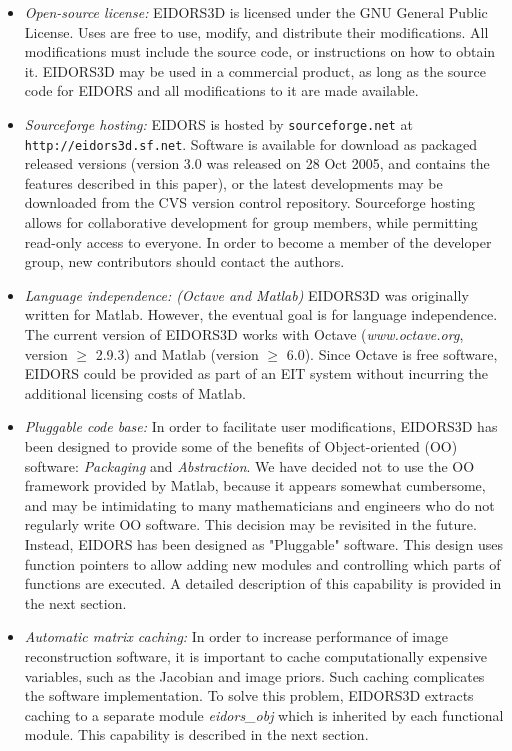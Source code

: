 \documentclass[12pt]{iopart}
\begin{document}
\begin{itemize}

  \item {\em Open-source license:}
EIDORS3D is licensed under the
GNU General Public License. Uses are free to use, modify, and
distribute their modifications. All modifications must include the
source code, or instructions on how to obtain it. EIDORS3D may be used
in a commercial product, as long as the source code for EIDORS and all
modifications to it are made available.

  \item {\em Sourceforge hosting:}
EIDORS is hosted by {\tt sourceforge.net}
at {\tt http://eidors3d.sf.net}.
Software is available for download as packaged released versions
(version 3.0 was released on 28 Oct 2005, and
contains the features described in this paper),
or the latest developments may be downloaded from the CVS
version control repository.
Sourceforge hosting allows for collaborative development for
group members, while permitting read-only access to everyone.
In order to become a member of the developer group, new
contributors should contact the authors.

  \item {\em Language independence: (Octave and Matlab)}
EIDORS3D was originally written for Matlab.
However, the eventual goal is for language independence.
The current version of EIDORS3D works with Octave
({\em www.octave.org}, version $\ge$ 2.9.3)
and Matlab (version $\ge$ 6.0).
Since Octave is free software, EIDORS could be provided
as part of an EIT system without incurring the additional
licensing costs of Matlab.

  \item {\em Pluggable code base:}
In order to facilitate user modifications, EIDORS3D
has been designed to provide some of the benefits of
Object-oriented (OO) software: {\em Packaging}
 and {\em Abstraction}. We have decided not to
use the OO framework provided by Matlab, because
it appears somewhat cumbersome, and may be intimidating
to many mathematicians and engineers who do not 
regularly write OO software. This decision may
be revisited in the future.
Instead, EIDORS has been designed as 
"Pluggable" software. This design uses function
pointers to allow adding new modules and controlling
which parts of functions are executed.
A detailed description of this capability is
provided in the next section.

  \item {\em Automatic matrix caching:}
In order to increase
performance of image reconstruction software, it is important to cache
computationally expensive variables, such as the Jacobian and image priors.
Such caching
complicates the software implementation. To solve this problem,
EIDORS3D extracts caching to a separate module {\em eidors\_obj}
which is inherited by
each functional module. This capability is described in the next section.


\end{itemize}
\end{document}
